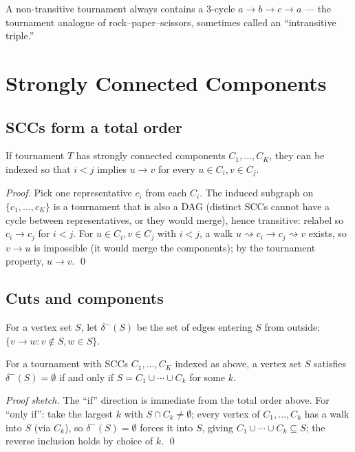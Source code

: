 \documentclass[11pt]{article}
\begin{document}
\begin{notebox}
A non-transitive tournament always contains a $3$-cycle $a\to b\to
c\to a$ --- the tournament analogue of rock–paper–scissors, sometimes
called an ``intransitive triple.''
\end{notebox}

\section{Strongly Connected Components}

\subsection{SCCs form a total order}
\begin{theorembox}
If tournament $T$ has strongly connected components $C_1, \ldots, C_K$,
they can be indexed so that $i < j$ implies $u \to v$ for every
$u \in C_i, v \in C_j$.

\emph{Proof.} Pick one representative $c_i$ from each $C_i$. The induced
subgraph on $\{c_1, \ldots, c_K\}$ is a tournament that is also a DAG
(distinct SCCs cannot have a cycle between representatives, or they would
merge), hence transitive: relabel so $c_i \to c_j$ for $i<j$. For
$u \in C_i, v \in C_j$ with $i<j$, a walk $u \rightsquigarrow c_i \to c_j
\rightsquigarrow v$ exists, so $v \to u$ is impossible (it would merge the
components); by the tournament property, $u \to v$. \qed
\end{theorembox}

\subsection{Cuts and components}
\begin{definitionbox}
For a vertex set $S$, let $\delta^-(S)$ be the set of edges entering $S$
from outside: $\{v \to w : v \notin S, w \in S\}$.
\end{definitionbox}

\begin{theorembox}
For a tournament with SCCs $C_1, \ldots, C_K$ indexed as above, a vertex
set $S$ satisfies $\delta^-(S) = \emptyset$ if and only if
$S = C_1 \cup \cdots \cup C_k$ for some $k$.

\emph{Proof sketch.} The ``if'' direction is immediate from the total
order above. For ``only if'': take the largest $k$ with $S \cap C_k \ne
\emptyset$; every vertex of $C_1, \ldots, C_k$ has a walk into $S$ (via
$C_k$), so $\delta^-(S) = \emptyset$ forces it into $S$, giving
$C_1\cup\cdots\cup C_k \subseteq S$; the reverse inclusion holds by choice
of $k$. \qed
\end{theorembox}
\end{document}
